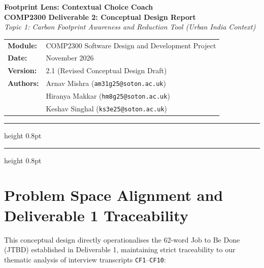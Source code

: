 \documentclass[12pt, a4paper]{article}
\begin{document}
\begin{center}
    \vspace*{0.5em}
    {\LARGE\bfseries\color{AcademicNavy} Footprint Lens: Contextual Choice Coach}\\[0.5em]
    {\Large\bfseries COMP2300 Deliverable 2: Conceptual Design Report}\\[0.3em]
    {\normalsize\itshape\color{AcademicSlate} Topic 1: Carbon Footprint Awareness and Reduction Tool (Urban India Context)}\\[1.2em]

    \begin{tabular}{ll}
        \textbf{Module:}  & COMP2300 Software Design and Development Project \\
        \textbf{Date:}    & November 2026 \\
        \textbf{Version:} & 2.1 (Revised Conceptual Design Draft) \\
        \textbf{Authors:} & Arnav Mishra (\texttt{am31g25@soton.ac.uk}) \\
                          & Hiranya Makkar (\texttt{hm8g25@soton.ac.uk}) \\
                          & Keshav Singhal (\texttt{ks3e25@soton.ac.uk})
    \end{tabular}
\end{center}
\vspace{0.8em}

{\color{AcademicNavy}\hrule height 0.8pt}
\vspace{0.3em}
\tableofcontents
\vspace{0.5em}
{\color{AcademicNavy}\hrule height 0.8pt}
\newpage

\section{Problem Space Alignment and Deliverable 1 Traceability}
This conceptual design directly operationalises the 62-word Job to Be Done (JTBD) established in Deliverable 1, maintaining strict traceability to our thematic analysis of interview transcripts \texttt{CF1}--\texttt{CF10}:
\end{document}
